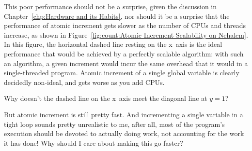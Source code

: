 This poor performance should not be a surprise, given the discussion in
Chapter~\ref{chp:Hardware and its Habits},
nor should it be a surprise that the performance of atomic increment
gets slower as the number of CPUs and threads increase, as shown in
Figure~\ref{fig:count:Atomic Increment Scalability on Nehalem}.
In this figure, the horizontal dashed line resting on the x~axis
is the ideal performance that would be achieved
by a perfectly scalable algorithm: with such an algorithm, a given
increment would incur the same overhead that it would in a single-threaded
program.
Atomic increment of a single global variable is clearly
decidedly non-ideal, and gets worse as you add CPUs.

\QuickQuiz{}
	Why doesn't the dashed line on the x~axis meet the 
	diagonal line at $y=1$?
 \QuickQuizEnd

\QuickQuiz{}
	But atomic increment is still pretty fast.
	And incrementing a single variable in a tight loop sounds
	pretty unrealistic to me, after all, most of the program's
	execution should be devoted to actually doing work, not accounting
	for the work it has done!
	Why should I care about making this go faster?
 \QuickQuizEnd

